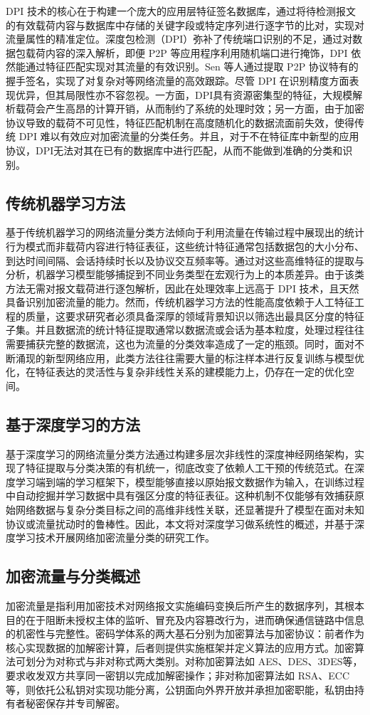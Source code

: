 DPI 技术的核心在于构建一个庞大的应用层特征签名数据库，通过将待检测报文的有效载荷内容与数据库中存储的关键字段或特定序列进行逐字节的比对，实现对流量属性的精准定位。深度包检测（DPI）弥补了传统端口识别的不足，通过对数据包载荷内容的深入解析，即便 P2P 等应用程序利用随机端口进行掩饰，DPI 依然能通过特征匹配实现对其流量的有效识别。Sen 等人通过提取 P2P 协议特有的握手签名，实现了对复杂对等网络流量的高效跟踪\cite{sen2004accurate}。尽管 DPI 在识别精度方面表现优异，但其局限性亦不容忽视。一方面，DPI具有资源密集型的特征，大规模解析载荷会产生高昂的计算开销，从而制约了系统的处理时效；另一方面，由于加密协议导致的载荷不可见性，特征匹配机制在高度随机化的数据流面前失效，使得传统 DPI 难以有效应对加密流量的分类任务。并且，对于不在特征库中新型的应用协议，DPI无法对其在已有的数据库中进行匹配，从而不能做到准确的分类和识别。

\subsection{传统机器学习方法}
基于传统机器学习的网络流量分类方法倾向于利用流量在传输过程中展现出的统计行为模式而非载荷内容进行特征表征，这些统计特征通常包括数据包的大小分布、到达时间间隔、会话持续时长以及协议交互频率等。通过对这些高维特征的提取与分析，机器学习模型能够捕捉到不同业务类型在宏观行为上的本质差异\cite{衣世东}。由于该类方法无需对报文载荷进行逐包解析，因此在处理效率上远高于 DPI 技术，且天然具备识别加密流量的能力。然而，传统机器学习方法的性能高度依赖于人工特征工程的质量，这要求研究者必须具备深厚的领域背景知识以筛选出最具区分度的特征子集。并且数据流的统计特征提取通常以数据流或会话为基本粒度，处理过程往往需要捕获完整的数据流，这也为流量的分类效率造成了一定的瓶颈。同时，面对不断涌现的新型网络应用，此类方法往往需要大量的标注样本进行反复训练与模型优化，在特征表达的灵活性与复杂非线性关系的建模能力上，仍存在一定的优化空间。

\subsection{基于深度学习的方法}
基于深度学习的网络流量分类方法通过构建多层次非线性的深度神经网络架构，实现了特征提取与分类决策的有机统一，彻底改变了依赖人工干预的传统范式。在深度学习端到端的学习框架下，模型能够直接以原始报文数据作为输入，在训练过程中自动挖掘并学习数据中具有强区分度的特征表征。这种机制不仅能够有效捕获原始网络数据与复杂分类目标之间的高维非线性关联，还显著提升了模型在面对未知协议或流量扰动时的鲁棒性。因此，本文将对深度学习做系统性的概述，并基于深度学习技术开展网络加密流量分类的研究工作。

\subsection{加密流量与分类概述}
加密流量是指利用加密技术对网络报文实施编码变换后所产生的数据序列，其根本目的在于阻断未授权主体的监听、冒充及内容篡改行为，进而确保通信链路中信息的机密性与完整性。密码学体系的两大基石分别为加密算法与加密协议：前者作为核心实现数据的加解密计算，后者则提供实施框架并定义算法的应用方式。加密算法可划分为对称式与非对称式两大类别。对称加密算法如 AES、DES、3DES等，要求收发双方共享同一密钥以完成加解密操作；非对称加密算法如 RSA、ECC等，则依托公私钥对实现功能分离，公钥面向外界开放并承担加密职能，私钥由持有者秘密保存并专司解密。

